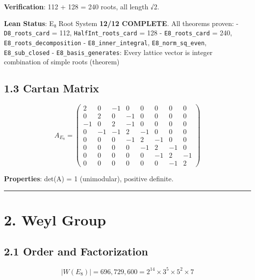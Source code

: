 \documentclass[11pt,a4paper]{article}
\begin{document}
\textbf{Verification}: 112 + 128 = 240 roots, all length √2.

\textbf{Lean Status}: E₈ Root System \textbf{12/12 COMPLETE}. All theorems proven: - \texttt{D8\_\allowbreak{}roots\_\allowbreak{}card} = 112, \texttt{Half\allowbreak{}Int\_\allowbreak{}roots\_\allowbreak{}card} = 128 - \texttt{E8\_\allowbreak{}roots\_\allowbreak{}card} = 240, \texttt{E8\_\allowbreak{}roots\_\allowbreak{}decomposition} - \texttt{E8\_\allowbreak{}inner\_\allowbreak{}integral}, \texttt{E8\_\allowbreak{}norm\_\allowbreak{}sq\_\allowbreak{}even}, \texttt{E8\_\allowbreak{}sub\_\allowbreak{}closed} - \texttt{E8\_\allowbreak{}basis\_\allowbreak{}generates}: Every lattice vector is integer combination of simple roots (theorem)

\subsection{1.3 Cartan Matrix}\label{cartan-matrix}

\[A_{E_8} = \begin{pmatrix}
2 & 0 & -1 & 0 & 0 & 0 & 0 & 0 \\
0 & 2 & 0 & -1 & 0 & 0 & 0 & 0 \\
-1 & 0 & 2 & -1 & 0 & 0 & 0 & 0 \\
0 & -1 & -1 & 2 & -1 & 0 & 0 & 0 \\
0 & 0 & 0 & -1 & 2 & -1 & 0 & 0 \\
0 & 0 & 0 & 0 & -1 & 2 & -1 & 0 \\
0 & 0 & 0 & 0 & 0 & -1 & 2 & -1 \\
0 & 0 & 0 & 0 & 0 & 0 & -1 & 2
\end{pmatrix}\]

\textbf{Properties}: det(A) = 1 (unimodular), positive definite.

\begin{center}\rule{\linewidth}{0.5pt}\end{center}

\section{2. Weyl Group}\label{weyl-group}

\subsection{2.1 Order and Factorization}\label{order-and-factorization}

\[|W(E_8)| = 696,729,600 = 2^{14} \times 3^5 \times 5^2 \times 7\]
\end{document}
